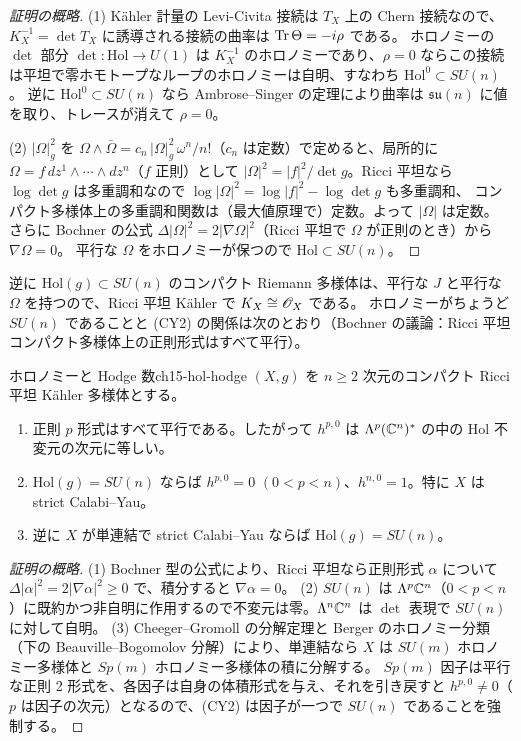 \begin{proof}[証明の概略]
(1) K\"ahler 計量の Levi-Civita 接続は $T_X$ 上の Chern 接続なので、$K_X^{-1} = \det T_X$ に誘導される接続の曲率は $\operatorname{Tr}\Theta = -i\rho$ である。
ホロノミーの $\det$ 部分 $\det:\mathrm{Hol}\to U(1)$ は $K_X^{-1}$ のホロノミーであり、$\rho=0$ ならこの接続は平坦で零ホモトープなループのホロノミーは自明、すなわち $\mathrm{Hol}^0\subset SU(n)$。
逆に $\mathrm{Hol}^0\subset SU(n)$ なら Ambrose--Singer の定理により曲率は $\mathfrak{su}(n)$ に値を取り、トレースが消えて $\rho = 0$。

(2) $|\Omega|^2_g$ を $\Omega\wedge\bar\Omega = c_n\,|\Omega|^2_g\,\omega^n/n!$（$c_n$ は定数）で定めると、局所的に $\Omega = f\,dz^1\wedge\cdots\wedge dz^n$（$f$ 正則）として
$|\Omega|^2 = |f|^2/\det g$。Ricci 平坦なら $\log\det g$ は多重調和なので $\log|\Omega|^2 = \log|f|^2 - \log\det g$ も多重調和、
コンパクト多様体上の多重調和関数は（最大値原理で）定数。よって $|\Omega|$ は定数。
さらに Bochner の公式 $\Delta|\Omega|^2 = 2|\nabla\Omega|^2$（Ricci 平坦で $\Omega$ が正則のとき）から $\nabla\Omega = 0$。
平行な $\Omega$ をホロノミーが保つので $\mathrm{Hol}\subset SU(n)$。
\end{proof}

逆に $\mathrm{Hol}(g)\subset SU(n)$ のコンパクト Riemann 多様体は、平行な $J$ と平行な $\Omega$ を持つので、Ricci 平坦 K\"ahler で $K_X\cong\mathscr{O}_X$ である。
ホロノミーがちょうど $SU(n)$ であることと (CY2) の関係は次のとおり（Bochner の議論：Ricci 平坦コンパクト多様体上の正則形式はすべて平行）。

\begin{myprop}{ホロノミーと Hodge 数}{ch15-hol-hodge}
$(X,g)$ を $n\geq 2$ 次元のコンパクト Ricci 平坦 K\"ahler 多様体とする。
\begin{enumerate}
\item 正則 $p$ 形式はすべて平行である。したがって $h^{p,0}$ は $\Lambda^p(\mathbb{C}^n)^*$ の中の $\mathrm{Hol}$ 不変元の次元に等しい。
\item $\mathrm{Hol}(g) = SU(n)$ ならば $h^{p,0} = 0$ $(0<p<n)$、$h^{n,0}=1$。特に $X$ は strict Calabi--Yau。
\item 逆に $X$ が単連結で strict Calabi--Yau ならば $\mathrm{Hol}(g) = SU(n)$。
\end{enumerate}
\end{myprop}

\begin{proof}[証明の概略]
(1) Bochner 型の公式により、Ricci 平坦なら正則形式 $\alpha$ について $\Delta|\alpha|^2 = 2|\nabla\alpha|^2\ge0$ で、積分すると $\nabla\alpha = 0$。
(2) $SU(n)$ は $\Lambda^p\mathbb{C}^n$（$0<p<n$）に既約かつ非自明に作用するので不変元は零。$\Lambda^n\mathbb{C}^n$ は $\det$ 表現で $SU(n)$ に対して自明。
(3) Cheeger--Gromoll の分解定理と Berger のホロノミー分類（下の Beauville--Bogomolov 分解）により、単連結なら $X$ は $SU(m)$ ホロノミー多様体と $Sp(m)$ ホロノミー多様体の積に分解する。
$Sp(m)$ 因子は平行な正則 2 形式を、各因子は自身の体積形式を与え、それを引き戻すと $h^{p,0}\neq0$（$p$ は因子の次元）となるので、(CY2) は因子が一つで $SU(n)$ であることを強制する。
\end{proof}

